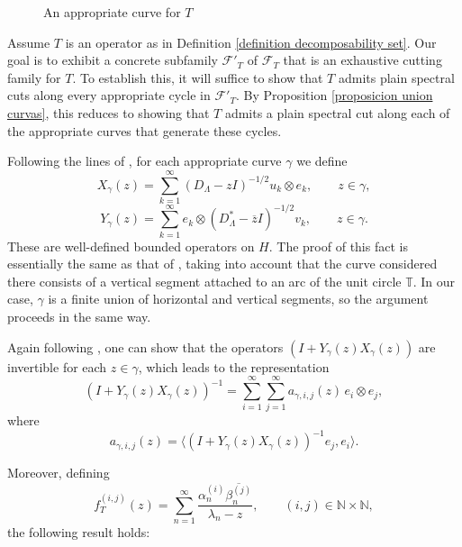 \documentclass[11pt]{amsart}
\theoremstyle{definition}
\theoremstyle{remark}
\numberwithin{equation}{section}
\newcommand{\pe}[1]{\langle#1\rangle}
\newcommand{\T}{\mathbb{T}}
\newcommand{\F}{\mathcal{F}}
\newcommand{\sumn}{\sum_{n=1}^{\infty}}
\newcommand{\sumk}{\sum_{k=1}^{\infty}}
\newcommand{\sumi}{\sum_{i=1}^\infty}
\newcommand{\sumj}{\sum_{j=1}^\infty}
\begin{document}
\begin{figure}[h!]
\hspace{-1cm}\caption{An appropriate curve for $T$} \label{fig:grid_gamma_snake}
\end{figure}





Assume $T$ is an operator as in Definition \ref{definition decomposability set}. Our goal is to exhibit a concrete subfamily $\F'_T$ of $\mathcal{F}_T$ that is an exhaustive cutting family for $T$. To establish this, it will suffice to show that $T$ admits  plain spectral cuts along every appropriate cycle in $\F'_T$. By Proposition \ref{proposicion union curvas}, this reduces to showing that $T$ admits a plain spectral cut along each of the appropriate curves that generate these cycles.

\medskip

Following the lines of \cite[Section 3]{GG3}, for each appropriate curve $\gamma$ we define
$$
X_\gamma(z) = \sumk (D_\Lambda-zI)^{-1/2}u_k\otimes e_k, \qquad z \in \gamma,
$$
$$
Y_\gamma(z) = \sumk e_k \otimes (D_\Lambda^*-\overline{z}I)^{-1/2}v_k, \qquad z \in \gamma.
$$
These are well-defined bounded operators on $H$. The proof of this fact is essentially the same as that of \cite[Proposition 3.3]{GG3}, taking into account that the curve considered there consists of a vertical segment attached to an arc of the unit circle $\T$. In our case, $\gamma$ is a finite union of horizontal and vertical segments, so the argument proceeds in the same way.	
	
\medskip
	
Again following \cite[Section 3]{GG3}, one can show that the operators $(I+Y_\gamma(z)X_\gamma(z))$ are invertible for each $z \in \gamma$, which leads to the representation
$$
(I+Y_\gamma(z)X_\gamma(z))^{-1} = \sumi \sumj a_{\gamma,i,j}(z)\, e_i\otimes e_j,
$$
where
$$
a_{\gamma,i,j}(z) = \pe{(I+Y_\gamma(z)X_\gamma(z))^{-1}e_j,e_i}.
$$

Moreover, defining
$$
f_T^{(i,j)}(z) = \sumn \frac{\alpha_n^{(i)}\overline{\beta_n^{(j)}}}{\lambda_n-z},
\qquad (i,j)\in \mathbb{N}\times\mathbb{N},
$$
the following result holds:	
\end{document}
